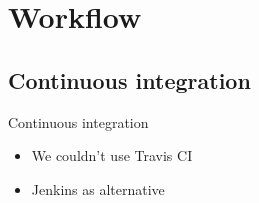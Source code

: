 \section{Workflow}
\subsection{Continuous integration}

\begin{frame}{Continuous integration}
\begin{itemize}
	\item We couldn't use Travis CI
	\item Jenkins as alternative
\end{itemize}
\end{frame}
